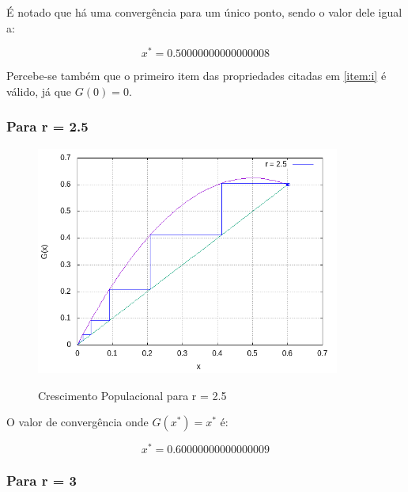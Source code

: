 \documentclass[a4paper, 12pt]{article}
\begin{document}
É notado que há uma convergência para um único ponto, sendo o valor dele igual a:

\begin{equation*}
	x^{*} = 0.50000000000000008
\end{equation*}


\hspace{0.5cm}

Percebe-se também que o primeiro item das propriedades citadas  em \ref{item:i} é válido, já que $G(0) = 0$.

\hspace{0.5cm}

\subsubsection{Para r = 2.5}

\begin{figure}[H]
	\centering
	\caption{Crescimento Populacional para r = 2.5}{}
	\includegraphics[width=10.0cm]{r=2_5.png}
	\label{fig:img2.5}
\end{figure}

O valor de convergência onde $G(x^{*}) = x^{*} $  é:

	
\hspace{0.5cm}

\begin{equation*}
	  x^{*} = 0.60000000000000009
\end{equation*}

\hspace{0.5cm}

\subsubsection{Para r = 3}
\end{document}
